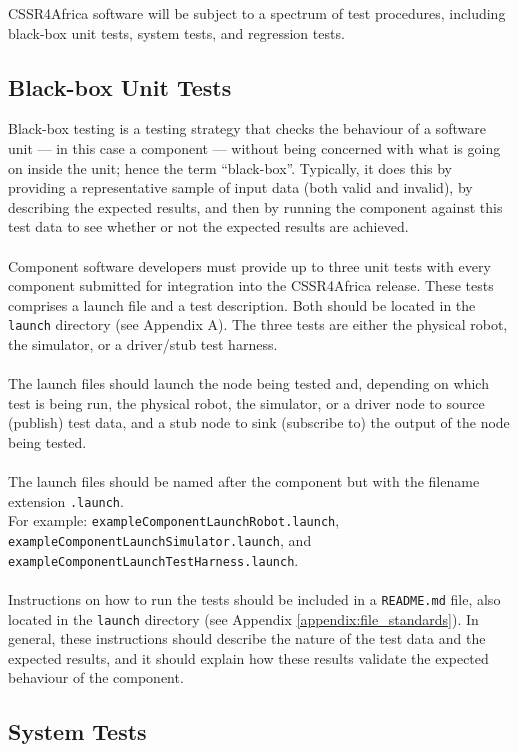 \documentclass{CSSRforAfrica}
\newcommand{\blank}{~\\}
\begin{document}
CSSR4Africa  software will be subject to a spectrum of test procedures, including black-box unit tests, system tests, and regression tests.

\subsection{Black-box Unit Tests}
\label{section:black_box_tests}

Black-box testing is a testing strategy that checks the behaviour of a software unit --- in this case a component --- without being concerned with what is going on inside the unit; hence the term ``black-box''.   Typically, it does this by providing a representative sample of input data (both valid and invalid), by describing the expected results, and then by running the component against this test data to see whether or not the expected results are achieved. 
\blank
~
\blank
Component software developers must provide up to three unit tests with every component submitted for integration into the CSSR4Africa  release.     These tests comprises  a launch file and a test description. Both should be located in the {\small \verb+launch+} directory (see Appendix A). The three tests are  either the physical robot, the simulator, or a driver/stub test harness.
\blank
~
\blank
The launch files should launch the node being tested and, depending on which test is being run,  the physical robot, the simulator, or a driver node to source (publish) test data, and a stub node to sink  (subscribe to) the output of the node being tested.   
\blank
~
\blank
The launch files  should be named after the component but with the filename extension {\small \verb+.launch+}.\\ For example: {\small \verb+exampleComponentLaunchRobot.launch+}, \\{\small \verb+exampleComponentLaunchSimulator.launch+}, and\\ {\small \verb+exampleComponentLaunchTestHarness.launch+}.  
\blank
~
\blank
Instructions on how to run the tests should be included in a {\small \verb+README.md+} file, also located in the  {\small \verb+launch+}  directory (see Appendix \ref{appendix:file_standards}). 
In general, these instructions should describe the nature of the test data and the expected results, and it should explain how these results validate the expected behaviour of the component.    


\subsection{System  Tests}
\label{section:system_tests}
 
\end{document}
